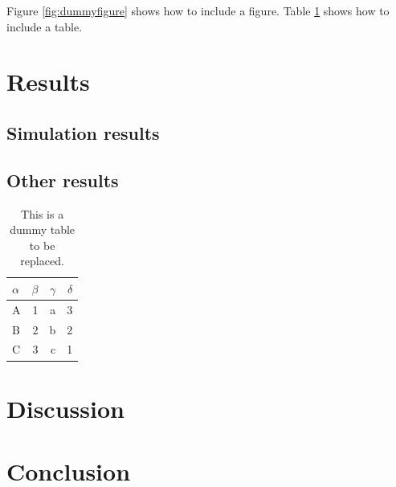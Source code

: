 Figure \ref{fig:dummyfigure} shows how to include a figure.
Table \ref{tab:dummytable} shows how to include a table.

\bigskip

\lipsum[2-7]

\section{Results}
\subsection{Simulation results}

\lipsum[2-3]

\subsection{Other results}
\lipsum[2-3]

\begin{table}
  \centering
  \begin{tabular}{lrrr}
  \toprule
  $\alpha$   & $\beta$ & $\gamma$ & $\delta$ \\
  \midrule
  A          & 1       & a        & 3        \\
  B          & 2       & b        & 2        \\
  C          & 3       & c        & 1        \\
  \bottomrule
  \end{tabular}
  \caption{This is a dummy table to be replaced.}
  \label{tab:dummytable}
\end{table}



\section{Discussion}
\lipsum[2-9]


\section{Conclusion}
\lipsum[2]


